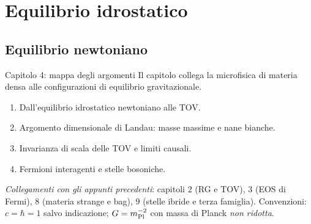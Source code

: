 \section{Equilibrio idrostatico}

\subsection{Equilibrio newtoniano}

\begin{frame}[t]{Capitolo 4: mappa degli argomenti}
\small
Il capitolo collega la microfisica di materia densa alle configurazioni di equilibrio gravitazionale.
\begin{enumerate}
\item Dall'equilibrio idrostatico newtoniano alle TOV.
\item Argomento dimensionale di Landau: masse massime e nane bianche.
\item Invarianza di scala delle TOV e limiti causali.
\item Fermioni interagenti e stelle bosoniche.
\end{enumerate}
\medskip
\textit{Collegamenti con gli appunti precedenti}: capitoli 2 (RG e TOV), 3 (EOS di Fermi), 8 (materia strange e bag), 9 (stelle ibride e terza famiglia).
\medskip
Convenzioni: $c=\hbar=1$ salvo indicazione; $G=m_{\rm Pl}^{-2}$ con massa di Planck \emph{non ridotta}.
\end{frame}


